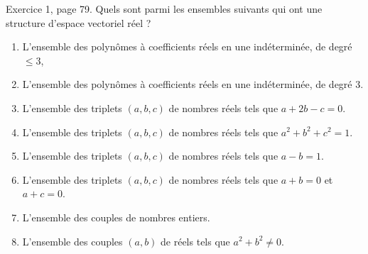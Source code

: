
\begin{exercice}\label{exoLineraire0013}

	Exercice 1, page 79. Quels sont parmi les ensembles suivants qui ont une structure d'espace vectoriel réel ?
	\begin{enumerate}

	\item
		L'ensemble des polynômes à coefficients réels en une indéterminée, de degré $\leq 3$,
	\item
		L'ensemble des polynômes à coefficients réels en une indéterminée, de degré 3.
	\item
		L'ensemble des triplets $(a,b,c)$ de nombres réels tels que $a+2b-c=0$.
	\item
		L'ensemble des triplets $(a,b,c)$ de nombres réels tels que $a^2+b^2+c^2=1$.
	\item
		L'ensemble des triplets $(a,b,c)$ de nombres réels tels que $a-b=1$.
	\item
		L'ensemble des triplets $(a,b,c)$ de nombres réels tels que $a+b=0$ et $a+c=0$.
	\item
		L'ensemble des couples de nombres entiers.
	\item
		L'ensemble des couples $(a,b)$ de réels tels que $a^2+b^2\neq 0$.
	\end{enumerate}
	

\end{exercice}
